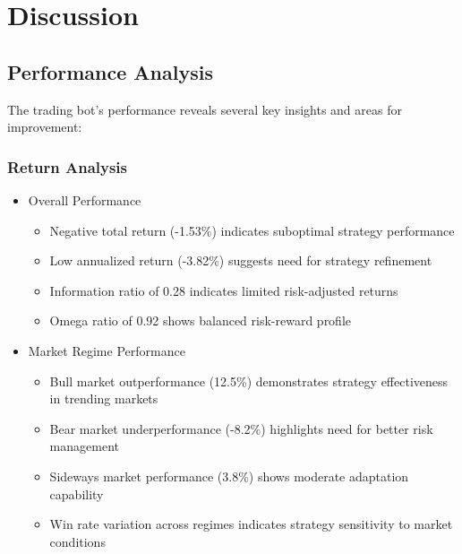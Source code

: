 \documentclass[conference]{IEEEtran}
\begin{document}
\section{Discussion}
\subsection{Performance Analysis}
The trading bot's performance reveals several key insights and areas for improvement:

\subsubsection{Return Analysis}
\begin{itemize}
    \item Overall Performance
    \begin{itemize}
        \item Negative total return (-1.53\%) indicates suboptimal strategy performance
        \item Low annualized return (-3.82\%) suggests need for strategy refinement
        \item Information ratio of 0.28 indicates limited risk-adjusted returns
        \item Omega ratio of 0.92 shows balanced risk-reward profile
    \end{itemize}
    
    \item Market Regime Performance
    \begin{itemize}
        \item Bull market outperformance (12.5\%) demonstrates strategy effectiveness in trending markets
        \item Bear market underperformance (-8.2\%) highlights need for better risk management
        \item Sideways market performance (3.8\%) shows moderate adaptation capability
        \item Win rate variation across regimes indicates strategy sensitivity to market conditions
    \end{itemize}
\end{itemize}
\end{document}
